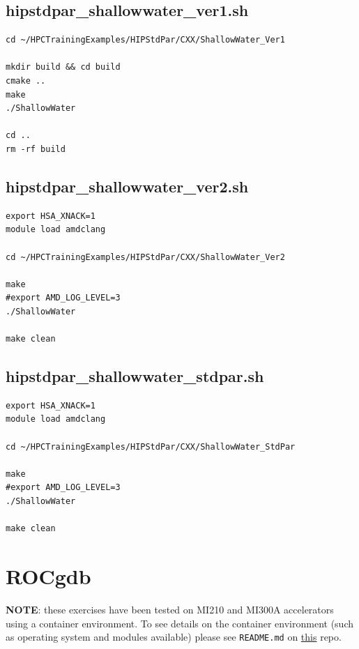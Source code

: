 \documentclass[
]{article}
\let\oldtexttt\texttt
\renewcommand{\texttt}[1]{
  \colorbox{Light}{\oldtexttt{#1}}
}
\begin{document}
\hypertarget{hipstdpar_shallowwater_ver1.sh}{%
\subsection{hipstdpar\_shallowwater\_ver1.sh}\label{hipstdpar_shallowwater_ver1.sh}}

\begin{verbatim}
cd ~/HPCTrainingExamples/HIPStdPar/CXX/ShallowWater_Ver1

mkdir build && cd build
cmake ..
make
./ShallowWater

cd ..
rm -rf build
\end{verbatim}

\hypertarget{hipstdpar_shallowwater_ver2.sh}{%
\subsection{hipstdpar\_shallowwater\_ver2.sh}\label{hipstdpar_shallowwater_ver2.sh}}

\begin{verbatim}
export HSA_XNACK=1
module load amdclang

cd ~/HPCTrainingExamples/HIPStdPar/CXX/ShallowWater_Ver2

make
#export AMD_LOG_LEVEL=3
./ShallowWater

make clean
\end{verbatim}

\hypertarget{hipstdpar_shallowwater_stdpar.sh}{%
\subsection{hipstdpar\_shallowwater\_stdpar.sh}\label{hipstdpar_shallowwater_stdpar.sh}}

\begin{verbatim}
export HSA_XNACK=1
module load amdclang

cd ~/HPCTrainingExamples/HIPStdPar/CXX/ShallowWater_StdPar

make
#export AMD_LOG_LEVEL=3
./ShallowWater

make clean
\end{verbatim}


\pagebreak

\hypertarget{rocgdb}{%
\section{ROCgdb}\label{rocgdb}}

\textbf{NOTE}: these exercises have been tested on MI210 and MI300A
accelerators using a container environment. To see details on the
container environment (such as operating system and modules available)
please see \texttt{README.md} on
\href{https://github.com/amd/HPCTrainingDock}{this} repo.
\end{document}
